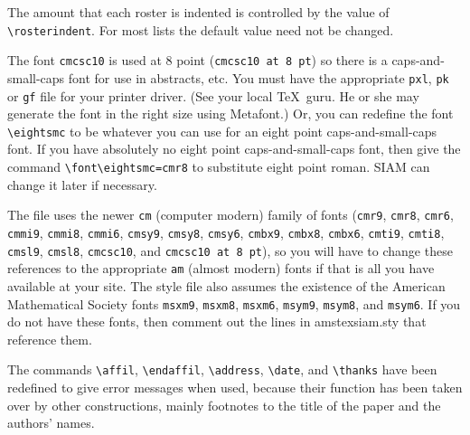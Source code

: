 The amount that each roster is indented is controlled by the value of
\verb"\rosterindent".  For most lists the default value need not
be changed.

 The font \verb"cmcsc10" is
used at 8 point (\verb"cmcsc10 at 8 pt") so there is a
caps-and-small-caps font for use in abstracts, etc.  You must
have the appropriate \verb"pxl", \verb"pk" or \verb"gf" file for
your printer driver. (See your local \TeX\ guru.  He or she may 
generate the font in the right size using Metafont.) 
Or, you can redefine the font \verb"\eightsmc"
to be whatever you can use for an eight point caps-and-small-caps font.
If you have absolutely no eight point caps-and-small-caps font, then
give the command \verb"\font\eightsmc=cmr8" to substitute
eight point roman.  SIAM can change it later if necessary.

The file uses
the newer \verb"cm" (computer modern) family of fonts (\verb"cmr9",
\verb"cmr8", \verb"cmr6", \verb"cmmi9", \verb"cmmi8", \verb"cmmi6",
\verb"cmsy9", \verb"cmsy8", \verb"cmsy6", \verb"cmbx9", \verb"cmbx8",
\verb"cmbx6", \verb"cmti9", \verb"cmti8", \verb"cmsl9", \verb"cmsl8",
\verb"cmcsc10", and \verb"cmcsc10 at 8 pt"), so you
will have to change these references to the appropriate \verb"am"
(almost modern) fonts
if that is all you have available
at your site.  The style file also assumes the
existence of the American Mathematical Society fonts
\verb"msxm9", \verb"msxm8", \verb"msxm6", \verb"msym9", \verb"msym8",
and \verb"msym6".  If you do
not have these fonts, then comment out the lines in amstexsiam.sty that
reference
them.

The commands
\verb"\affil", \verb"\endaffil", \verb"\address", \verb"\date", and
\verb"\thanks" have been redefined to give error messages when used, because
their function has been taken over by other constructions, mainly footnotes
to the title of the paper and the authors' names.
\bye
